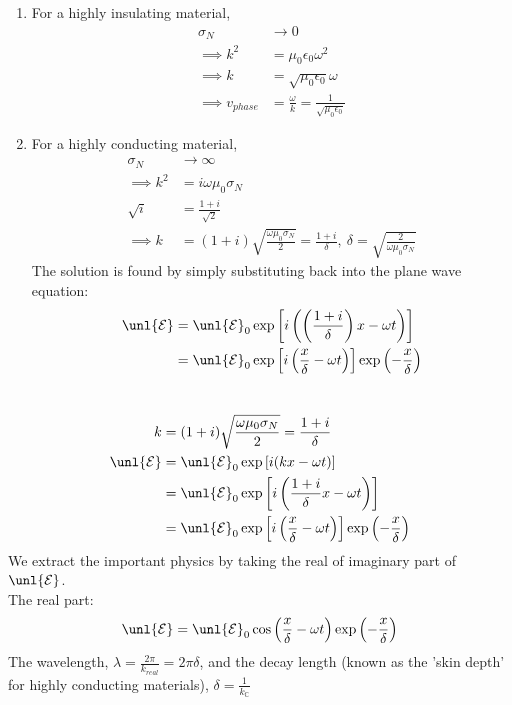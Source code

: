 \documentclass[a4paper, 11pt, normalem]{report}
\newcommand\E{\mathcal{E}}
\newcommand\uE{\unl{\E}}
\newcommand\eno{\epsilon_0}
\newcommand\om{\omega}
\newcommand\lam{\lambda}
\begin{document}
\begin{enumerate}
    \item For a highly insulating material,
    \begin{align*}
        \sigma_N &\to 0 \\
        \implies k^2 &= \mu_0\eno\omega^2 \\
        \implies k &= \sqrt{\mu_0\eno}\omega \\
        \implies v_{phase} &= \frac{\omega}{k} = \frac{1}{\sqrt{\mu_0\eno}}
    \end{align*}
    \item For a highly conducting material,
    \begin{align*}
        \sigma_N &\to \infty \\
        \implies k^2 &= i\omega\mu_0\sigma_N \\
        \sqrt{i} &= \frac{1 + i}{\sqrt{2}} \\
        \implies k &= (1 + i)\sqrt{\frac{\omega\mu_0\sigma_N}{2}} = \frac{1 + i}{\delta}, ~\delta = \sqrt{\frac{2}{\omega\mu_0\sigma_N}}
    \end{align*}
    The solution is found by simply substituting back into the plane wave equation:
    \begin{align*}
        \uE &= \uE_0\exp\left[i\left(\left(\frac{1 + i}{\delta}\right)x - \omega t\right)\right] \\
        &= \uE_0\exp\left[i\left(\frac{x}{\delta} - \omega t\right)\right]\exp\left(-\frac{x}{\delta}\right)
    \end{align*}
\end{enumerate}

\chapter{}
\begin{align*}
    k &= (1 + i)\sqrt{\frac{\om\mu_0\sigma_N}{2}} = \frac{1 + i}{\delta} \\
    \uE &= \uE_0 \exp\left[i(kx - \om t)\right] \\
    &= \uE_0\exp\left[i\left(\frac{1+i}{\delta}x - \om t\right)\right] \\
    &= \uE_0\exp\left[i\left(\frac{x}{\delta} - \om t\right)\right]\exp\left(-\frac{x}{\delta}\right)
\end{align*}
We extract the important physics by taking the real of imaginary part of $\uE$.\\
The real part:
\begin{equation*}
    \uE = \uE_0\cos\left(\frac{x}{\delta}- \om t\right)\exp\left(-\frac{x}{\delta}\right)
\end{equation*}
The wavelength, $\lam = \frac{2\pi}{k_{real}} = 2\pi\delta$, and the decay length (known as the 'skin depth' for highly conducting materials), $\delta = \frac{1}{k_{\mathbb{C}}}$
\end{document}
